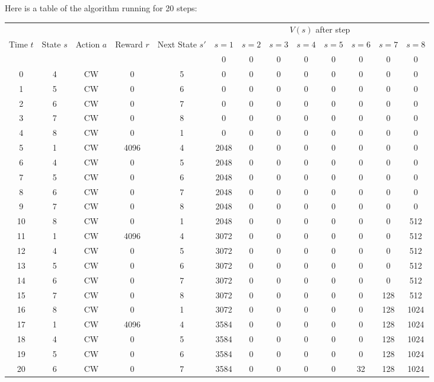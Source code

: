 \begin{solution}
Here is a table of the algorithm running for 20 steps:
\begin{center}
    \begin{tabular}{c|cccc|cccccccc}
        & & & & & \multicolumn{8}{c}{ $V(s)$ after step } \\
        Time $t$ & State $s$ & Action $a$ & Reward $r$ & Next State $s'$ & $s=1$ & $s=2$ & $s=3$ & $s=4$ & $s=5$ & $s=6$ & $s=7$ & $s=8$ \\
        \hline
        & & & & & 0 & 0 & 0 & 0 & 0 & 0 & 0 & 0 \\
        0 & 4 & CW & 0 & 5 & 0 & 0 & 0 & 0 & 0 & 0 & 0 & 0 \\
        1 & 5 & CW & 0 & 6 & 0 & 0 & 0 & 0 & 0 & 0 & 0 & 0 \\
        2 & 6 & CW & 0 & 7 & 0 & 0 & 0 & 0 & 0 & 0 & 0 & 0 \\
        3 & 7 & CW & 0 & 8 & 0 & 0 & 0 & 0 & 0 & 0 & 0 & 0 \\
        4 & 8 & CW & 0 & 1 & 0 & 0 & 0 & 0 & 0 & 0 & 0 & 0 \\
        5 & 1 & CW & 4096 & 4 & 2048 & 0 & 0 & 0 & 0 & 0 & 0 & 0 \\
        6 & 4 & CW & 0 & 5 & 2048 & 0 & 0 & 0 & 0 & 0 & 0 & 0 \\
        7 & 5 & CW & 0 & 6 & 2048 & 0 & 0 & 0 & 0 & 0 & 0 & 0 \\
        8 & 6 & CW & 0 & 7 & 2048 & 0 & 0 & 0 & 0 & 0 & 0 & 0 \\
        9 & 7 & CW & 0 & 8 & 2048 & 0 & 0 & 0 & 0 & 0 & 0 & 0 \\
        10 & 8 & CW & 0 & 1 & 2048 & 0 & 0 & 0 & 0 & 0 & 0 & 512 \\
        11 & 1 & CW & 4096 & 4 & 3072 & 0 & 0 & 0 & 0 & 0 & 0 & 512 \\
        12 & 4 & CW & 0 & 5 & 3072 & 0 & 0 & 0 & 0 & 0 & 0 & 512 \\
        13 & 5 & CW & 0 & 6 & 3072 & 0 & 0 & 0 & 0 & 0 & 0 & 512 \\
        14 & 6 & CW & 0 & 7 & 3072 & 0 & 0 & 0 & 0 & 0 & 0 & 512 \\
        15 & 7 & CW & 0 & 8 & 3072 & 0 & 0 & 0 & 0 & 0 & 128 & 512 \\
        16 & 8 & CW & 0 & 1 & 3072 & 0 & 0 & 0 & 0 & 0 & 128 & 1024 \\
        17 & 1 & CW & 4096 & 4 & 3584 & 0 & 0 & 0 & 0 & 0 & 128 & 1024 \\
        18 & 4 & CW & 0 & 5 & 3584 & 0 & 0 & 0 & 0 & 0 & 128 & 1024 \\
        19 & 5 & CW & 0 & 6 & 3584 & 0 & 0 & 0 & 0 & 0 & 128 & 1024 \\
        20 & 6 & CW & 0 & 7 & 3584 & 0 & 0 & 0 & 0 & 32 & 128 & 1024 \\
    \end{tabular}
\end{center}


\end{solution}
